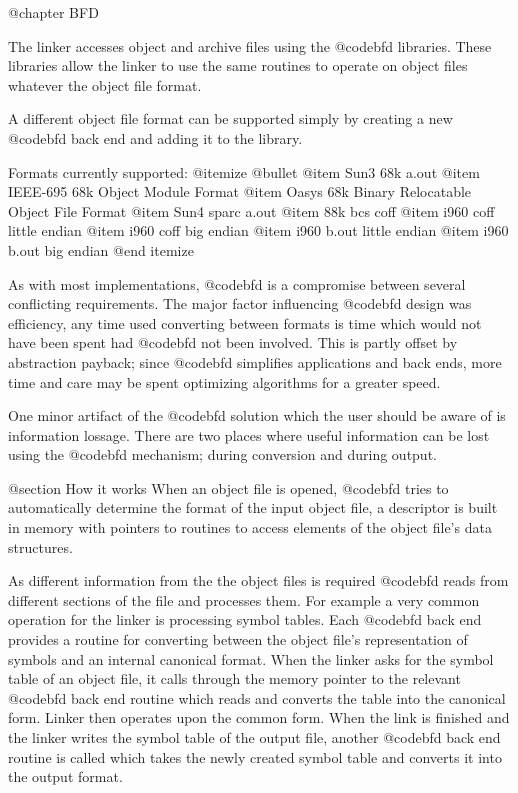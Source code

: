@chapter BFD

The linker accesses object and archive files using the @code{bfd}
libraries. These libraries allow the linker to use the same routines
to operate on object files whatever the object file format.

A different object file format can be supported simply by creating a
new @code{bfd} back end and adding it to the library.

Formats currently supported:
@itemize @bullet
@item 
Sun3 68k a.out
@item 
IEEE-695 68k Object Module Format
@item 
Oasys 68k Binary Relocatable Object File Format
@item 
Sun4 sparc a.out
@item 
88k bcs coff
@item 
i960 coff little endian
@item 
i960 coff big endian
@item 
i960 b.out little endian
@item 
i960 b.out big endian
@end itemize

As with most implementations, @code{bfd} is a compromise between
several conflicting requirements. The major factor influencing
@code{bfd} design was efficiency, any time used converting between
formats is time which would not have been spent had @code{bfd} not
been involved. This is partly offset by abstraction payback; since
@code{bfd} simplifies applications and back ends, more time and care
may be spent optimizing algorithms for a greater speed.

One minor artifact of the @code{bfd} solution which the
user should be aware of is information lossage.
There are two places where useful information can be lost using the 
@code{bfd} mechanism; during conversion and during output. 

@section How it works
When an object file is opened, @code{bfd}
tries to automatically determine the format of the input object file, a
descriptor is built in memory with pointers to routines to access
elements of the object file's data structures.

As different information from the the object files is required
@code{bfd} reads from different sections of the file and processes
them. For example a very common operation for the linker is processing
symbol tables.  Each @code{bfd} back end provides a routine for
converting between the object file's representation of symbols and an
internal canonical format. When the linker asks for the symbol table
of an object file, it calls through the memory pointer to the relevant
@code{bfd} back end routine which reads and converts the table into
the canonical form.  Linker then operates upon the common form. When
the link is finished and the linker writes the symbol table of the
output file, another @code{bfd} back end routine is called which takes
the newly created symbol table and converts it into the output format.

